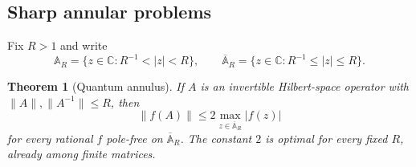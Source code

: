 \documentclass[preprints,article,submit,oneauthor]{Definitions/mdpi}
\newcounter{manuscriptresult}[section]
\theoremstyle{mdpi}
\newtheorem{theorem}[manuscriptresult]{Theorem}
\theoremstyle{definition}
\newcommand{\C}{\mathbb C}
\begin{document}
\subsection{Sharp annular problems}

Fix $R>1$ and write
\[
  \mathbb A_R=\{z\in\C:R^{-1}<\lvert z\rvert<R\},
  \qquad
  \overline{\mathbb A}_R=
  \{z\in\C:R^{-1}\leq\lvert z\rvert\leq R\}.
\]

\begin{theorem}[Quantum annulus]
\label{thm:quantum-annulus-discussion}
If $A$ is an invertible Hilbert-space operator with
$\lVert A\rVert,\lVert A^{-1}\rVert\leq R$, then
\begin{equation}
  \lVert f(A)\rVert\leq2
  \max_{z\in\overline{\mathbb A}_R}\lvert f(z)\rvert
  \label{eq:quantum-annulus-discussion}
\end{equation}
for every rational $f$ pole-free on
$\overline{\mathbb A}_R$.  The constant $2$ is optimal for every
fixed $R$, already among finite matrices.
\end{theorem}
\end{document}
